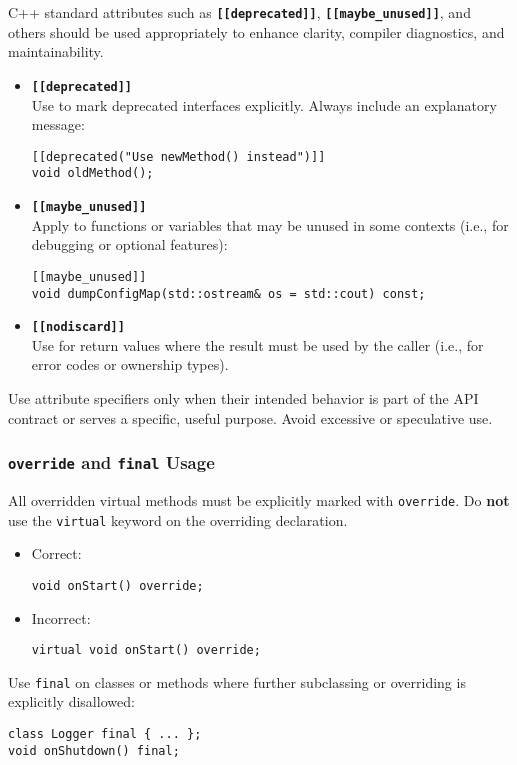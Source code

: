 C++ standard attributes such as \texttt{\textbf{[[deprecated]]}}, \texttt{\textbf{[[maybe\_unused]]}}, and others should be used appropriately to enhance clarity, compiler diagnostics, and maintainability.
\begin{itemize}
  \item \textbf{\texttt{[[deprecated]]}} \\
  Use to mark deprecated interfaces explicitly. Always include an explanatory message:
  \begin{lstlisting}[style=cppstyle]
[[deprecated("Use newMethod() instead")]]
void oldMethod();
  \end{lstlisting}

  \item \textbf{\texttt{[[maybe\_unused]]}} \\
  Apply to functions or variables that may be unused in some contexts (i.e., for debugging or optional features):
  \begin{lstlisting}[style=cppstyle]
[[maybe_unused]]
void dumpConfigMap(std::ostream& os = std::cout) const;
  \end{lstlisting}

  \item \textbf{\texttt{[[nodiscard]]}} \\
  Use for return values where the result must be used by the caller (i.e., for error codes or ownership types).
\end{itemize}
Use attribute specifiers only when their intended behavior is part of the API contract or serves a specific, useful purpose. Avoid excessive or speculative use.

\subsubsection*{\texttt{override} and \texttt{final} Usage}

All overridden virtual methods must be explicitly marked with \texttt{override}. Do \textbf{not} use the \texttt{virtual} keyword on the overriding declaration.
\begin{itemize}
  \item Correct:
  \begin{lstlisting}[style=cppstyle]
void onStart() override;
  \end{lstlisting}
  \item Incorrect:
  \begin{lstlisting}[style=cppstyle]
virtual void onStart() override;
  \end{lstlisting}
\end{itemize}
Use \texttt{final} on classes or methods where further subclassing or overriding is explicitly disallowed:
\begin{lstlisting}[style=cppstyle]
class Logger final { ... };
void onShutdown() final;
\end{lstlisting}


